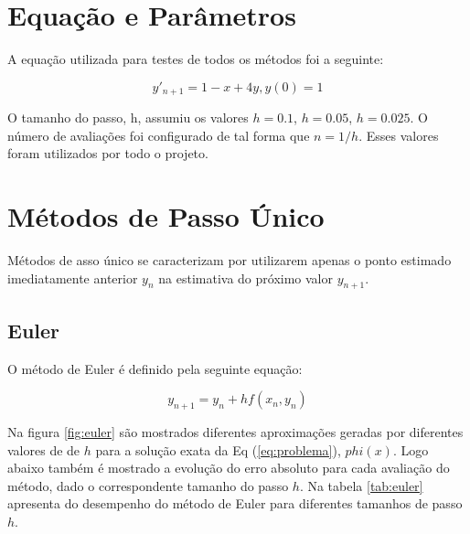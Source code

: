 \documentclass[a4paper]{article}
\begin{document}
\section{Equação e Parâmetros}

A equação utilizada para testes de todos os métodos foi a seguinte:

\begin{equation}
\label{eq:problema}
y'_{n+1} = 1 - x + 4y,  y(0) = 1 
\end{equation}

O tamanho do passo, h, assumiu os valores $h = 0.1$, $h = 0.05$, $h = 0.025$. O número de avaliações foi configurado de tal forma que $n = 1/h$. Esses valores foram utilizados por todo o projeto.

\pagebreak 

\section{Métodos de Passo Único}
\label{sec:examples}

Métodos de asso único se caracterizam por utilizarem apenas o ponto estimado imediatamente anterior $y_{n}$ na estimativa do próximo valor $y_{n+1}$.

\subsection{Euler}

O método de Euler é definido pela seguinte equação:

\begin{equation}
y_{n+1} = y_{n} + hf(x_{n},y_{n})
\end{equation}


Na figura \ref{fig:euler} são mostrados diferentes aproximações geradas por diferentes valores de de $h$ para a solução exata da Eq (\ref{eq:problema}), $phi(x)$. Logo abaixo também é mostrado a evolução do erro absoluto para cada avaliação do método, dado o correspondente tamanho do passo $h$. Na tabela \ref{tab:euler} apresenta do desempenho do método de Euler para diferentes tamanhos de passo $h$.
\end{document}
